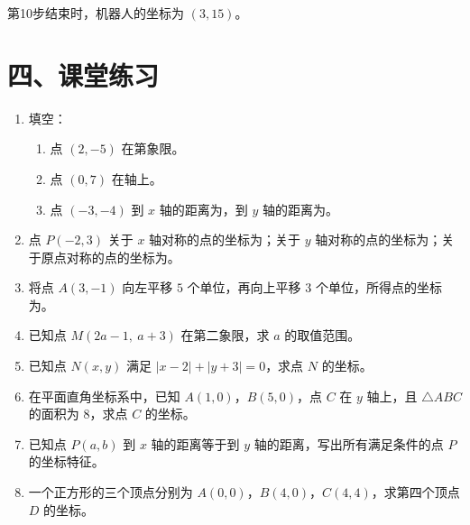 \documentclass[12pt, a4paper]{ctexart}
\newcommand{\blank}[1]{\underline{\hspace{#1}}}
\begin{document}
第10步结束时，机器人的坐标为 $\boxed{(3, 15)}$。

\section*{\textcolor{tipgreen}{四、课堂练习}}

\begin{enumerate}[label=\textbf{\arabic*.}, leftmargin=2em]
  \item 填空：
  \begin{enumerate}[label=(\arabic*)]
    \item 点 $(2, -5)$ 在第\blank{1cm}象限。
    \item 点 $(0, 7)$ 在\blank{1cm}轴上。
    \item 点 $(-3, -4)$ 到 $x$ 轴的距离为\blank{1cm}，到 $y$ 轴的距离为\blank{1cm}。
  \end{enumerate}

  \item 点 $P(-2, 3)$ 关于 $x$ 轴对称的点的坐标为\blank{1.5cm}；关于 $y$ 轴对称的点的坐标为\blank{1.5cm}；关于原点对称的点的坐标为\blank{1.5cm}。

  \item 将点 $A(3, -1)$ 向左平移 $5$ 个单位，再向上平移 $3$ 个单位，所得点的坐标为\blank{1.5cm}。

  \item 已知点 $M(2a - 1,\ a + 3)$ 在第二象限，求 $a$ 的取值范围。

  \item 已知点 $N(x, y)$ 满足 $|x - 2| + |y + 3| = 0$，求点 $N$ 的坐标。

  \item 在平面直角坐标系中，已知 $A(1, 0)$，$B(5, 0)$，点 $C$ 在 $y$ 轴上，且 $\triangle ABC$ 的面积为 $8$，求点 $C$ 的坐标。

  \item 已知点 $P(a, b)$ 到 $x$ 轴的距离等于到 $y$ 轴的距离，写出所有满足条件的点 $P$ 的坐标特征。

  \item 一个正方形的三个顶点分别为 $A(0, 0)$，$B(4, 0)$，$C(4, 4)$，求第四个顶点 $D$ 的坐标。
\end{enumerate}

\bigskip
\end{document}

